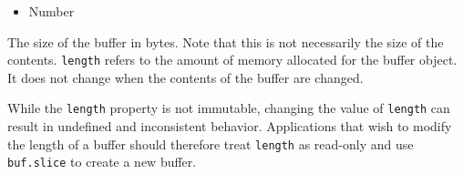 \begin{itemize}
\itemsep1pt\parskip0pt
\item
  Number
\end{itemize}

The size of the buffer in bytes. Note that this is not necessarily the
size of the contents. \texttt{length} refers to the amount of memory
allocated for the buffer object. It does not change when the contents of
the buffer are changed.

\begin{Shaded}
\begin{Highlighting}[]
 \NormalTok{(}\NormalTok{);}

\NormalTok{(}\NormalTok{);}
\NormalTok{(}\NormalTok{, }\NormalTok{, }\NormalTok{);}
\NormalTok{(}\NormalTok{);}

\end{Highlighting}
\end{Shaded}

While the \texttt{length} property is not immutable, changing the value
of \texttt{length} can result in undefined and inconsistent behavior.
Applications that wish to modify the length of a buffer should therefore
treat \texttt{length} as read-only and use \texttt{buf.slice} to create
a new buffer.

\begin{Shaded}
\begin{Highlighting}[]
 \NormalTok{(}\NormalTok{);}
\NormalTok{(}\NormalTok{, }\NormalTok{, }\NormalTok{);}
\NormalTok{(}\NormalTok{); }
\NormalTok{(}\NormalTok{,}\NormalTok{);}
\NormalTok{(}\NormalTok{); }
\end{Highlighting}
\end{Shaded}

